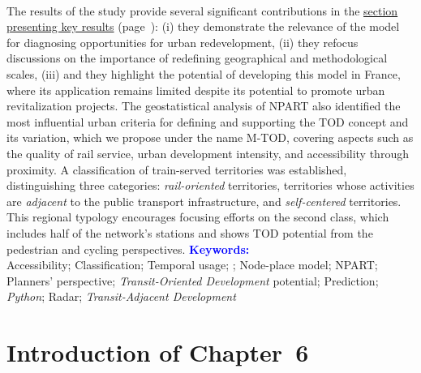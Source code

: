 \begin{refsegment}
\begin{tcolorbox}
{    \\
The results of the study provide several significant contributions in the \hyperref[chap6:resultats-modele]{section presenting key results} (page~\pageref{chap6:resultats-modele}): (i) they demonstrate the relevance of the model for diagnosing opportunities for urban redevelopment, (ii) they refocus discussions on the importance of redefining geographical and methodological scales, (iii) and they highlight the potential of developing this model in France, where its application remains limited despite its potential to promote urban revitalization projects. The geostatistical analysis of \acrshort{NPART} also identified the most influential urban criteria for defining and supporting the \acrshort{TOD} concept and its variation, which we propose under the name \acrshort{M-TOD}, covering aspects such as the quality of rail service, urban development intensity, and \gls{accessibility} through proximity. A classification of train-served territories was established, distinguishing three categories: \textsl{rail-oriented} territories, territories whose activities are \textsl{adjacent} to the public transport infrastructure, and \textsl{self-centered} territories. This regional typology encourages focusing efforts on the second class, which includes half of the network's stations and shows \acrshort{TOD} potential from the pedestrian and cycling perspectives.%
    }
    \tcblower
\Large{\textcolor{blue}{\textbf{Keywords:}}}
    \\
    \small{
Accessibility;
Classification;
Temporal usage;
;
Node-place model;
NPART;
Planners' perspective;
\textsl{Transit-Oriented Development} potential;
Prediction;
\textsl{Python};
Radar;
\textsl{Transit-Adjacent Development}
    }
    \end{tcolorbox}

\newpage
{} %
\section*{Introduction of Chapter~6
    \label{chap6:introduction}
    }


\end{refsegment}
